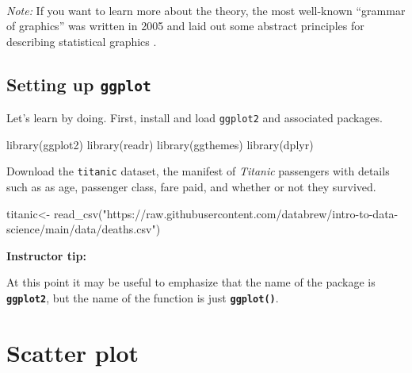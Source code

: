 \documentclass[
]{book}
\newenvironment{Shaded}{\begin{snugshade}}{\end{snugshade}}
\newcommand{\FunctionTok}[1]{\textcolor[rgb]{0.00,0.00,0.00}{#1}}
\newcommand{\NormalTok}[1]{#1}
\newcommand{\OtherTok}[1]{\textcolor[rgb]{0.56,0.35,0.01}{#1}}
\newcommand{\StringTok}[1]{\textcolor[rgb]{0.31,0.60,0.02}{#1}}
\begin{document}
~

\emph{Note:} If you want to learn more about the theory, the most well-known ``grammar of graphics'' was written in 2005 and laid out some abstract principles for describing statistical graphics \citep{10.5555/1088896}.

\hypertarget{setting-up-ggplot}{%
\subsection*{\texorpdfstring{Setting up \texttt{ggplot}}{Setting up ggplot}}\label{setting-up-ggplot}}

Let's learn by doing. First, install and load \texttt{ggplot2} and associated packages.

\begin{Shaded}
\begin{Highlighting}[]
\FunctionTok{library}\NormalTok{(ggplot2)}
\FunctionTok{library}\NormalTok{(readr)}
\FunctionTok{library}\NormalTok{(ggthemes)}
\FunctionTok{library}\NormalTok{(dplyr)}
\end{Highlighting}
\end{Shaded}

Download the \texttt{titanic} dataset, the manifest of \emph{Titanic} passengers with details such as as age, passenger class, fare paid, and whether or not they survived.

\begin{Shaded}
\begin{Highlighting}[]
\NormalTok{titanic}\OtherTok{\textless{}{-}} \FunctionTok{read\_csv}\NormalTok{(}\StringTok{"https://raw.githubusercontent.com/databrew/intro{-}to{-}data{-}science/main/data/deaths.csv"}\NormalTok{)}
\end{Highlighting}
\end{Shaded}

\leavevmode{}%
\textbf{Instructor tip:}

At this point it may be useful to emphasize that the name of the package is \textbf{\texttt{ggplot2}}, but the name of the function is just \textbf{\texttt{ggplot()}}.

\hypertarget{scatter-plot}{%
\section*{Scatter plot}\label{scatter-plot}}
\end{document}
